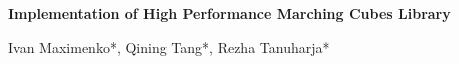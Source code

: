  {
    \fancyhf{}
}

\begin{center}
    \large{\textbf{Implementation of High Performance Marching Cubes Library} }\\[11pt]
\end{center}
\begin{center}
    Ivan Maximenko*,
    Qining Tang*,
    Rezha Tanuharja*\\[5pt]
\end{center}

\long{}

{
    \let\thefootnote\relax{}
}


